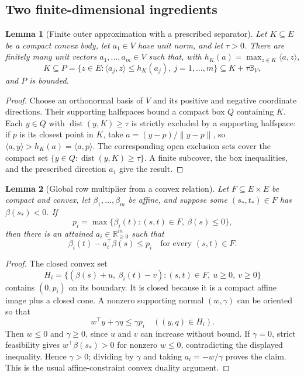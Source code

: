 \documentclass[10pt,letterpaper]{article}
\newtheorem{lemma}{Lemma}
\theoremstyle{remark}
\newcommand{\R}{\mathbb R}
\newcommand{\dist}{\operatorname{dist}}
\newcommand{\ball}{\mathbb B_V}
\begin{document}
\subsection{Two finite-dimensional ingredients}
\begin{lemma}[Finite outer approximation with a prescribed separator]\label{lem:poly}
Let $K\subseteq E$ be a compact convex body, let $a_1\in V$ have unit norm, and let $\tau>0$. There are finitely many unit vectors $a_1,\ldots,a_m\in V$ such that, with $h_K(a)=\max_{z\in K}\langle a,z\rangle$,
\[
 K\subseteq P=\{z\in E:\langle a_j,z\rangle\leq h_K(a_j),\ j=1,\ldots,m\}
 \subseteq K+\tau\ball,
\]
and $P$ is bounded.
\end{lemma}
\begin{proof}
Choose an orthonormal basis of $V$ and its positive and negative coordinate directions. Their supporting halfspaces bound a compact box $Q$ containing $K$. Each $y\in Q$ with $\dist(y,K)\geq\tau$ is strictly excluded by a supporting halfspace: if $p$ is its closest point in $K$, take $a=(y-p)/\|y-p\|$, so $\langle a,y\rangle>h_K(a)=\langle a,p\rangle$. The corresponding open exclusion sets cover the compact set $\{y\in Q:\dist(y,K)\geq\tau\}$. A finite subcover, the box inequalities, and the prescribed direction $a_1$ give the result.
\end{proof}

\begin{lemma}[Global row multiplier from a convex relation]\label{lem:dual}
Let $F\subseteq E\times E$ be compact and convex, let $\beta_1,\ldots,\beta_m$ be affine, and suppose some $(s_*,t_*)\in F$ has $\beta(s_*)<0$. If
\[
 p_i=\max\{\beta_i(t):(s,t)\in F,\ \beta(s)\leq0\},
\]
then there is an attained $a_i\in\R_{\geq0}^m$ such that
\[
 \beta_i(t)-a_i^\top\beta(s)\leq p_i\quad\text{for every }(s,t)\in F.
\]
\end{lemma}
\begin{proof}
The closed convex set
\[
 H_i=\{(\beta(s)+u,\ \beta_i(t)-v):(s,t)\in F,\ u\geq0,\ v\geq0\}
\]
contains $(0,p_i)$ on its boundary. It is closed because it is a compact affine image plus a closed cone. A nonzero supporting normal $(w,\gamma)$ can be oriented so that
\[
 w^\top y+\gamma q\leq\gamma p_i\quad((y,q)\in H_i).
\]
Then $w\leq0$ and $\gamma\geq0$, since $u$ and $v$ can increase without bound. If $\gamma=0$, strict feasibility gives $w^\top\beta(s_*)>0$ for nonzero $w\leq0$, contradicting the displayed inequality. Hence $\gamma>0$; dividing by $\gamma$ and taking $a_i=-w/\gamma$ proves the claim. This is the usual affine-constraint convex duality argument.
\end{proof}
\end{document}

